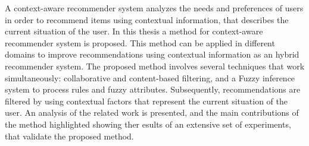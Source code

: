 A context-aware recommender system analyzes the needs and
preferences of users in order to recommend items using contextual
information, that describes the current situation of the user. In this
thesis a method for context-aware recommender system is proposed. This
method can be applied in different domains to improve 
recommendations using contextual information as an hybrid recommender system.
The proposed method involves several techniques that work
simultaneously: collaborative and content-based filtering,
and a Fuzzy inference system to process rules and fuzzy
attributes. Subsequently, recommendations are filtered by using contextual
factors that represent the current situation of the user. An analysis 
of the related work is presented, and the main
contributions of the method highlighted showing ther esults of an 
extensive set of experiments, that validate the proposed method.











